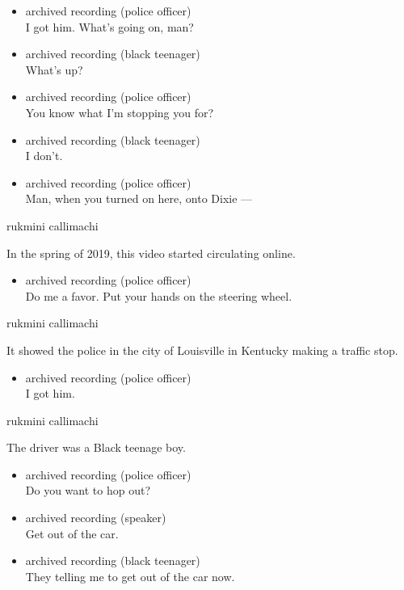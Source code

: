\begin{itemize}
\item
  archived recording (police officer)\\
  I got him. What's going on, man?
\item
  archived recording (black teenager)\\
  What's up?
\item
  archived recording (police officer)\\
  You know what I'm stopping you for?
\item
  archived recording (black teenager)\\
  I don't.
\item
  archived recording (police officer)\\
  Man, when you turned on here, onto Dixie ---
\end{itemize}

rukmini callimachi

In the spring of 2019, this video started circulating online.

\begin{itemize}
\tightlist
\item
  archived recording (police officer)\\
  Do me a favor. Put your hands on the steering wheel.
\end{itemize}

rukmini callimachi

It showed the police in the city of Louisville in Kentucky making a
traffic stop.

\begin{itemize}
\tightlist
\item
  archived recording (police officer)\\
  I got him.
\end{itemize}

rukmini callimachi

The driver was a Black teenage boy.

\begin{itemize}
\item
  archived recording (police officer)\\
  Do you want to hop out?
\item
  archived recording (speaker)\\
  Get out of the car.
\item
  archived recording (black teenager)\\
  They telling me to get out of the car now.
\end{itemize}

